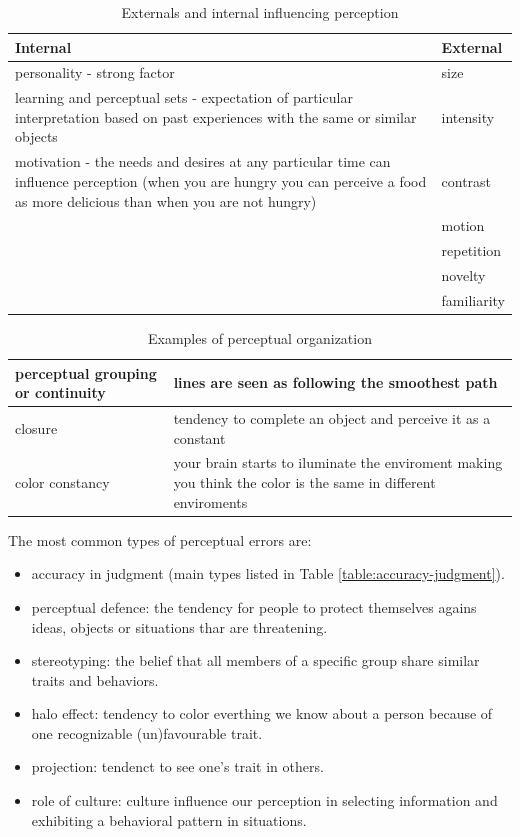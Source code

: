 \documentclass[12pt,article,oneside,a4paper]{memoir}
\begin{document}
\begin{table}
  \begin{tabular}{ p{13cm} |  p{2cm} }
    \hline
    Internal & External \\ \hline
    personality -  strong factor & size \\ \hline
    learning and perceptual sets - expectation of particular interpretation based on past experiences with the same or similar objects & intensity \\ \hline
    motivation - the needs and desires at any particular time can influence perception (when you are hungry you can perceive a food as more delicious than when you are not hungry) & contrast \\ \hline
	 & motion \\ \hline
 	 & repetition \\ \hline
 	 & novelty \\ \hline
     & familiarity \\
    \hline
  \end{tabular}
  \caption{Externals and internal influencing perception}
  \label{table:factors-perception}
\end{table}

\begin{table}
  \begin{tabular}{ l |  p{12.5cm} }
    \hline
    perceptual grouping or continuity & lines are seen as following the smoothest path \\ \hline
    closure & tendency to complete an object and perceive it as a constant \\ \hline
    color constancy & your brain starts to iluminate the enviroment making you think the color is the same in different enviroments \\
    \hline
  \end{tabular}
  \caption{Examples of perceptual organization}
  \label{table:perceptual-organization}
\end{table}

The most common types of perceptual errors are:
\begin{itemize}
\item accuracy in judgment (main types listed in Table \ref{table:accuracy-judgment}).
\item perceptual defence: the tendency for people to protect themselves agains ideas, objects or situations thar are threatening.
\item stereotyping: the belief that all members of a specific group share similar traits and behaviors.
\item halo effect: tendency to color everthing we know about a person because of one recognizable (un)favourable trait.
\item projection: tendenct to see one's trait in others.
\item role of culture: culture influence our perception in selecting information and exhibiting a behavioral pattern in situations.
\end{itemize}
\end{document}
